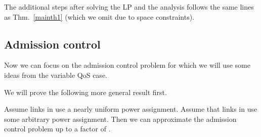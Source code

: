 \documentclass[11pt]{amsart}
\begin{document}
The additional steps after solving the LP and the analysis follows the same lines as Thm.~\ref{mainth1} (which we omit due to space constraints).


\subsection*{Admission control}

Now we can focus on the admission control problem for which we will use some ideas
from the variable QoS case.

We will prove the following more general result first.
\begin{theorem}
Assume links in  use a nearly uniform power assignment. Assume that links in  use some
arbitrary power assignment. Then we can approximate the admission control problem up to a  factor of .
\label{admingen1}
\end{theorem}
\end{document}
